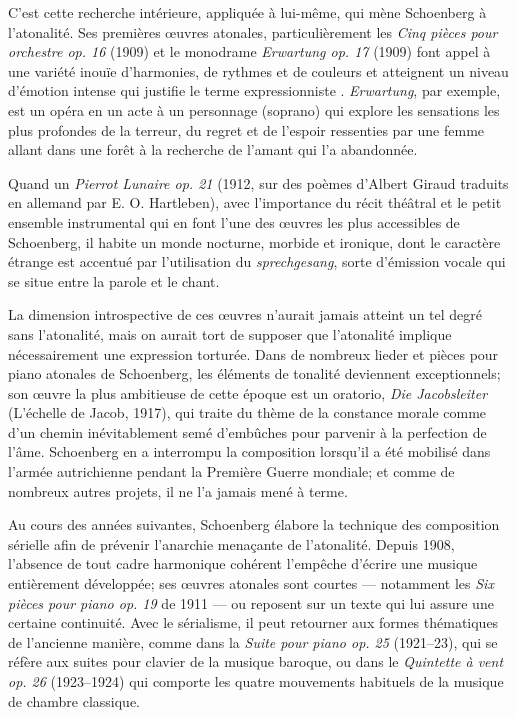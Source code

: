 \documentclass[11pt,a4paper]{scrreprt}
\begin{document}
C'est cette recherche intérieure, appliquée à lui-même, qui mène Schoenberg à l'atonalité. Ses premières \oe{}uvres atonales, particulièrement les \emph{Cinq pièces pour orchestre op. 16} (1909) et le monodrame \emph{Erwartung op. 17} (1909) font appel à une variété inouïe d'harmonies, de rythmes et de couleurs et atteignent un niveau d'émotion intense qui justifie le terme \og{} expressionniste \fg{}. \emph{Erwartung}, par exemple, est un opéra en un acte à un personnage (soprano) qui explore les sensations les plus profondes de la terreur, du regret et de l'espoir ressenties par une femme allant dans une forêt à la recherche de l'amant qui l'a abandonnée.

Quand un \emph{Pierrot Lunaire op. 21} (1912, sur des poèmes d'Albert Giraud traduits en allemand par E. O. Hartleben), avec l'importance du récit théâtral et le petit ensemble instrumental qui en font l'une des \oe{}uvres les plus accessibles de Schoenberg, il habite un monde nocturne, morbide et ironique, dont le caractère étrange est accentué par l'utilisation du \emph{sprechgesang}, sorte d'émission vocale qui se situe entre la parole et le chant.

La dimension introspective de ces \oe{}uvres n'aurait jamais atteint un tel degré sans l'atonalité, mais on aurait tort de supposer que l'atonalité implique nécessairement une expression torturée. Dans de nombreux lieder et pièces pour piano atonales de Schoenberg, les éléments de tonalité deviennent exceptionnels; son \oe{}uvre la plus ambitieuse de cette époque est un oratorio, \emph{Die Jacobsleiter} (L'échelle de Jacob, 1917), qui traite du thème de la constance morale comme d'un chemin inévitablement semé d'embûches pour parvenir à la perfection de l'âme. Schoenberg en a interrompu la composition lorsqu'il a été mobilisé dans l'armée autrichienne pendant la Première Guerre mondiale; et comme de nombreux autres projets, il ne l'a jamais mené à terme.

Au cours des années suivantes, Schoenberg élabore la technique des composition sérielle afin de prévenir l'anarchie menaçante de l'atonalité. Depuis 1908, l'absence de tout cadre harmonique cohérent l'empêche d'écrire une musique entièrement développée; ses \oe{}uvres atonales sont courtes --- notamment les \emph{Six pièces pour piano op. 19} de 1911 --- ou reposent sur un texte qui lui assure une certaine continuité. Avec le sérialisme, il peut retourner aux formes thématiques de l'ancienne manière, comme dans la \emph{Suite pour piano op. 25} (1921--23), qui se réfère aux suites pour clavier de la musique baroque, ou dans le \emph{Quintette à vent op. 26} (1923--1924) qui comporte les quatre mouvements habituels de la musique de chambre classique.
\end{document}

